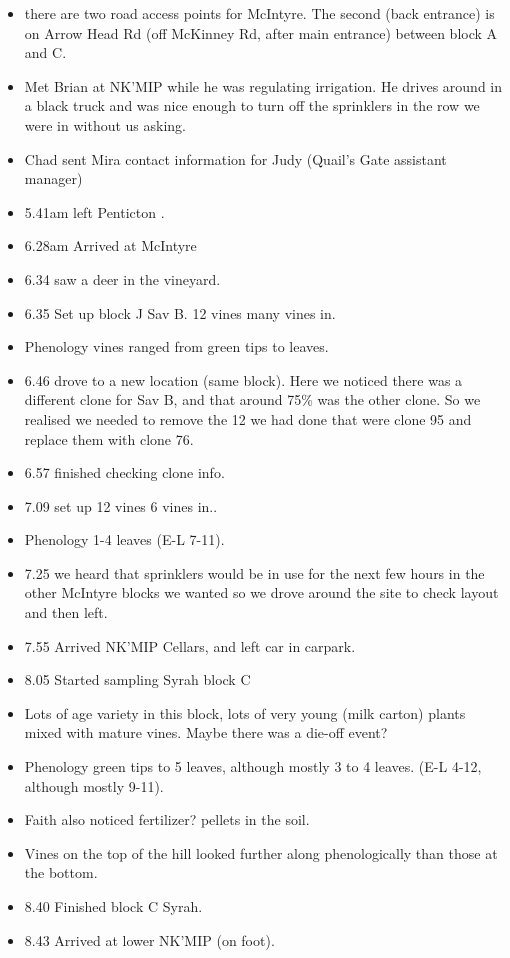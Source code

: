 \documentclass[11pt,letter]{article}
\newenvironment{smitemize}{
\begin{itemize}
  \setlength{\itemsep}{0pt}
  \setlength{\parskip}{0.8pt}
  \setlength{\parsep}{0pt}}
{\end{itemize}
}
\begin{document}
\begin{smitemize}
\item there are two road access points for McIntyre. The second (back entrance) is on Arrow Head Rd (off McKinney Rd, after main entrance) between block A and C.
\item Met Brian at NK'MIP while he was regulating irrigation. He drives around in a black truck and was nice enough to turn off the sprinklers in the row we were in without us asking.
\item Chad sent Mira contact information for Judy (Quail's Gate assistant manager)
\item 5.41am left Penticton .
\item 6.28am Arrived at McIntyre
\item 6.34 saw a deer in the vineyard.
\item 6.35 Set up block J Sav B. 12 vines many vines in.
\item Phenology vines ranged from green tips to leaves.
\item 6.46 drove to a new location (same block). Here we noticed there was a different clone for Sav B, and that around 75\% was the other clone. So we realised we needed to remove the 12 we had done that were clone 95 and replace them with clone 76. 
\item 6.57 finished checking clone info.
\item 7.09 set up 12 vines 6 vines in..
\item Phenology 1-4 leaves (E-L 7-11). 
\item 7.25 we heard that sprinklers would be in use for the next few hours in the other McIntyre blocks we wanted so we drove around the site to check layout and then left. 
\item 7.55 Arrived NK'MIP Cellars, and left car in carpark.
\item 8.05 Started sampling Syrah block C
\item Lots of age variety in this block, lots of very young (milk carton) plants mixed with mature vines. Maybe there was a die-off event? 
\item Phenology green tips to 5 leaves, although mostly 3 to 4 leaves. (E-L 4-12, although mostly 9-11).
\item Faith also noticed fertilizer? pellets in the soil. 
\item Vines on the top of the hill looked further along phenologically than those at the bottom.
\item 8.40 Finished block C Syrah.
\item 8.43 Arrived at lower NK'MIP (on foot).

\end{smitemize}
\end{document}
